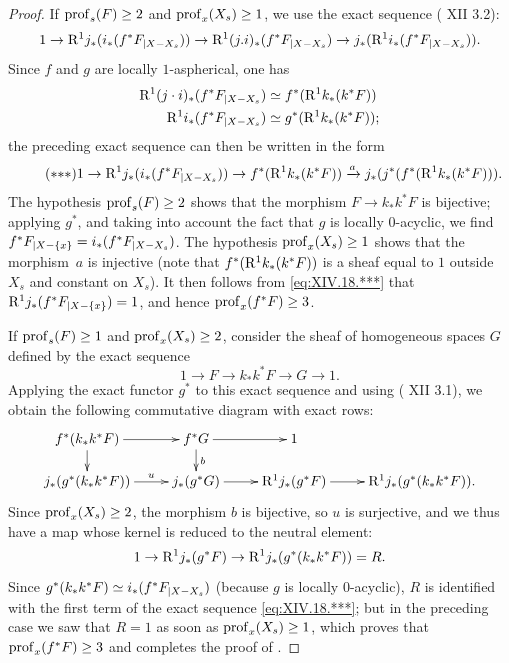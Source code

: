 \begin{proof}
If $\prof_s(F)\geq 2$ and $\prof_x(X_s)\geq 1$, we use the exact sequence ( XII 3.2):
$$1\to\R^1j_*(i_*(f^*\sisi{F{|X-X_s}}{F_{|X-X_s}}))\to\R^1(j.i)_*(f^*\sisi{F{|X-X_s}}{F_{|X-X_s}}) \to j_*(\R^1i_*(f^*\sisi{F{|X-X_s}}{F_{|X-X_s}})).
$$
Since $f$ and $g$ are locally $1$-aspherical, one has
\begin{align*}
\R^1(j\cdot i)_*(f^*\sisi{F{|X-X_s}}{F_{|X-X_s}})&\simeq f^*(\R^1k_*(k^*F)) \\
\R^1i_*(f^*\sisi{F{|X-X_s}}{F_{|X-X_s}})&\simeq g^*(\R^1k_*(k^*F));
\end{align*}
the preceding exact sequence can then be written in the form
\enlargethispage{\baselineskip}%
\begin{equation} \label{eq:XIV.18.***}\tag{${*}{*}{*}$}
1\to\R^1j_*(i_*(f^*\sisi{F{|X-X_s}}{F_{|X-X_s}}))\to f^*(\R^1k_*(k^*F))\lto{a} j_*(j^*(f^*(\R^1k_*(k^*F))).
\end{equation}
The hypothesis $\prof_s(F)\geq 2$ shows that the morphism $F\to k_*k^*F$ is bijective; applying $g^*$, and taking into account the fact that $g$ is locally $0$-acyclic, we find $f^*\sisi{F{|X-\{x\}}}{F_{|X-\{x\}}}=i_*(f^*\sisi{F{|X-X_s}}{F_{|X-X_s}})$. The hypothesis $\prof_x(X_s)\geq 1$ shows that the morphism~$a$ is injective (note that $f^*(\R^1k_*(k^*F))$ is a sheaf equal to $1$ outside $X_s$ and constant on $X_s$). It then follows from \eqref{eq:XIV.18.***} that $\R^1j_*(f^*\sisi{F{|X-\{x\}}}{F_{|X-\{x\}}})=1$, and hence $\prof_x(f^*F)\geq 3$\pageoriginale.

\enlargethispage{.8\baselineskip}%
If $\prof_s(F)\geq 1$ and $\prof_x(X_s)\geq 2$, consider the sheaf of homogeneous spaces $G$ defined by the exact sequence
$$
1\to F\to k_*k^*F\to G\to 1.
$$
Applying the exact functor $g^*$ to this exact sequence and using ( XII 3.1), we obtain the following commutative diagram with exact rows:
$$
\xymatrix@R=5mm{f^*(k_*k^*F)\ar[r]\ar[d]&f^*G\ar[r]\ar[d]^b&1\\
j_*(g^*(k_*k^*F))\sisi{\ar[r]}{\ar[r]^-{u}}&j_*(g^*G)\ar[r]&\R^1j_*(g^*F) \ar[r]&\R^1j_*(g^*(k_*k^*F)).}
$$
Since $\prof_x(X_s)\geq 2$, the morphism $b$ is bijective, so $u$ is surjective, and we thus have a map whose kernel is reduced to the neutral element:
$$
1\to\R^1j_*(g^*F)\to\R^1j_*(g^*(k_*k^*F))=R.
$$
Since $g^*(k_*k^*F)\simeq i_*(f^*\sisi{F{|X-X_s}}{F_{|X-X_s}})$ (because $g$ is locally $0$-acyclic), $R$ is identified with the first term of the exact sequence \eqref{eq:XIV.18.***}; but in the preceding case we saw that $R=1$ as soon as $\prof_x(X_s)\geq 1$, which proves that $\prof_x(f^*F)\geq 3$ and completes the proof of .
\skipqed
\end{proof}


